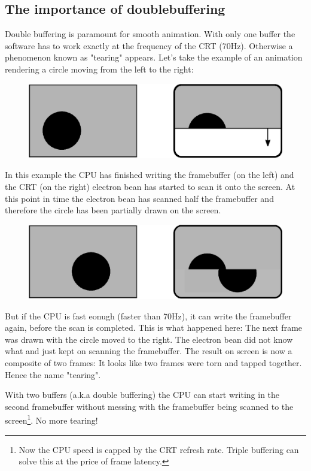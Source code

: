 \documentclass[book.tex]{subfiles}
\begin{document}
\subsection{The importance of doublebuffering}
Double buffering is paramount for smooth animation. With only one buffer the software has to work exactly at the frequency of the CRT (70Hz). Otherwise a phenomenon known as "tearing" appears. Let's take the example of an animation rendering a circle moving from the left to the right:
\par
\begin{figure}[H]
\centering
\includegraphics[width=\textwidth]{imgs/drawings/doublebuffer_before.eps}
\end{figure}
\par
In this example the CPU has finished writing the framebuffer (on the left) and the CRT (on the right) electron bean has started to scan it onto the screen. At this point in time the electron bean has scanned half the framebuffer and therefore the circle has been partially drawn on the screen.
\par
\begin{figure}[H]
\centering
\includegraphics[width=\textwidth]{imgs/drawings/doublebuffer_after.eps}
\end{figure}
\par
But if the CPU is fast eonugh (faster than 70Hz), it can write the framebuffer again, before the scan is completed. This is what happened here: The next frame was drawn with the circle moved to the right. The electron bean did not know what and just kept on scanning the framebuffer. The result on screen is now a composite of two frames: It looks like two frames were torn and tapped together. Hence the name "tearing".\\
\par
With two buffers (a.k.a double buffering) the CPU can start writing in the second framebuffer without messing with the framebuffer being scanned to the screen\footnote{Now the CPU speed is capped by the CRT refresh rate. Triple buffering can solve this at the price of frame latency.}. No more tearing!
\end{document}
